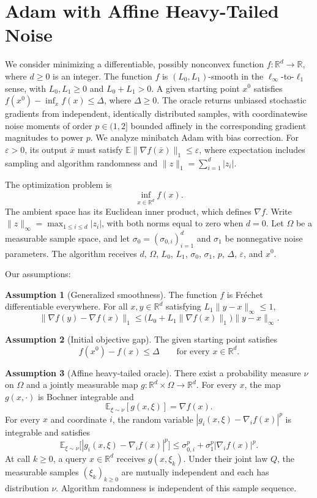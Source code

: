 \documentclass[10pt]{article}
\theoremstyle{definition}
\newtheorem{assumption}{Assumption}
\begin{document}
\section*{Adam with Affine Heavy-Tailed Noise}
We consider minimizing a differentiable, possibly nonconvex function $f:\mathbb{R}^d\to\mathbb{R}$, where $d\geq0$ is an integer. The function $f$ is $(L_0,L_1)$-smooth in the $\ell_\infty$-to-$\ell_1$ sense, with $L_0,L_1\geq0$ and $L_0+L_1>0$. A given starting point $x^0$ satisfies $f(x^0)-\inf_x f(x)\leq\Delta$, where $\Delta\geq0$. The oracle returns unbiased stochastic gradients from independent, identically distributed samples, with coordinatewise noise moments of order $p\in(1,2]$ bounded affinely in the corresponding gradient magnitudes to power $p$. We analyze minibatch Adam with bias correction. For $\varepsilon>0$, its output $\bar{x}$ must satisfy $\mathbb{E}\|\nabla f(\bar{x})\|_1\leq\varepsilon$, where expectation includes sampling and algorithm randomness and $\|z\|_1=\sum_{i=1}^d|z_i|$.

The optimization problem is
\[
\inf_{x\in\mathbb{R}^d} f(x).
\]
The ambient space has its Euclidean inner product, which defines $\nabla f$. Write $\|z\|_\infty=\max_{1\leq i\leq d}|z_i|$, with both norms equal to zero when $d=0$. Let $\Omega$ be a measurable sample space, and let $\sigma_0=(\sigma_{0,i})_{i=1}^d$ and $\sigma_1$ be nonnegative noise parameters. The algorithm receives $d$, $\Omega$, $L_0$, $L_1$, $\sigma_0$, $\sigma_1$, $p$, $\Delta$, $\varepsilon$, and $x^0$.

Our assumptions:
\begin{assumption}[Generalized smoothness]
The function $f$ is Fr\'echet differentiable everywhere. For all $x,y\in\mathbb{R}^d$ satisfying $L_1\|y-x\|_\infty\leq1$,
\[
\|\nabla f(y)-\nabla f(x)\|_1
\leq \bigl(L_0+L_1\|\nabla f(x)\|_1\bigr)\|y-x\|_\infty.
\]
\end{assumption}

\begin{assumption}[Initial objective gap]
The given starting point satisfies
\[
f(x^0)-f(x)\leq\Delta
\qquad\text{for every }x\in\mathbb{R}^d.
\]
\end{assumption}

\begin{assumption}[Affine heavy-tailed oracle]
There exist a probability measure $\nu$ on $\Omega$ and a jointly measurable map $g:\mathbb{R}^d\times\Omega\to\mathbb{R}^d$. For every $x$, the map $g(x,\cdot)$ is Bochner integrable and
\[
\mathbb{E}_{\xi\sim\nu}[g(x,\xi)]=\nabla f(x).
\]
For every $x$ and coordinate $i$, the random variable $|g_i(x,\xi)-\nabla_i f(x)|^p$ is integrable and satisfies
\[
\mathbb{E}_{\xi\sim\nu}
 \bigl[|g_i(x,\xi)-\nabla_i f(x)|^p\bigr]
\leq \sigma_{0,i}^p+\sigma_1^p|\nabla_i f(x)|^p.
\]
At call $k\geq0$, a query $x\in\mathbb{R}^d$ receives $g(x,\xi_k)$. Under their joint law $Q$, the measurable samples $(\xi_k)_{k\geq0}$ are mutually independent and each has distribution $\nu$. Algorithm randomness is independent of this sample sequence.
\end{assumption}
\end{document}
